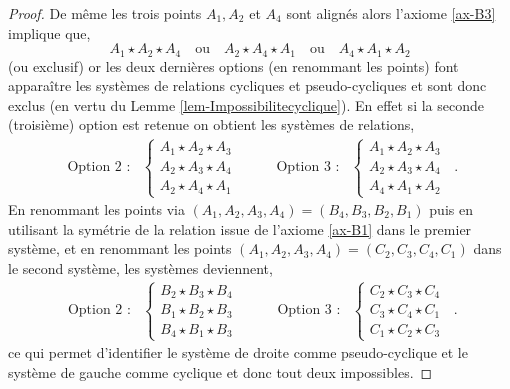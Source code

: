 \begin{cor}
\begin{proof}
        De même les trois points $A_1,A_2$ et $A_4$ sont alignés alors l'axiome \ref{ax-B3} implique que,
        \begin{equation*}
            A_1 \star A_2 \star A_4 \quad\text{ou}\quad A_2 \star A_4 \star A_1 \quad\text{ou}\quad A_4 \star A_1 \star A_2 
        \end{equation*}
        (ou exclusif) or les deux dernières options (en renommant les points) font apparaître les systèmes de relations cycliques et pseudo-cycliques et sont donc exclus (en vertu du Lemme \ref{lem-Impossibilitecyclique}). En effet si la seconde (troisième) option est retenue on obtient les systèmes de relations,
        \begin{equation*}
        \begin{array}{cccc}
        \text{Option 2 }:&\left\{
            \begin{array}{cc}
                 A_{1} \star A_{2} \star A_{3} \\
                 A_{2} \star A_{3} \star A_{4} \\
                 A_2 \star A_4 \star A_1
            \end{array}
            \right. &\qquad\text{Option 3 } :&    \left\{\begin{array}{c}
                 A_{1} \star A_{2} \star A_{3} \\
                 A_{2} \star A_{3} \star A_{4} \\
                 A_4 \star A_1 \star A_2
            \end{array}\right.
        \end{array} \,.
        \end{equation*}
        En renommant les points via $(A_1,A_2,A_3,A_4)=( B_4,B_3,B_2,B_1)$ puis en utilisant la symétrie de la relation  issue de l'axiome \ref{ax-B1} dans le premier système, et en renommant les points $(A_1,A_2,A_3,A_4)=(C_2,C_3,C_4,C_1)$ dans le second système, les systèmes deviennent,
        \begin{equation*}
        \begin{array}{cccc}
        \text{Option 2 }:&\left\{
            \begin{array}{c}
                 B_{2} \star B_{3} \star B_{4} \\
                 B_{1} \star B_{2} \star B_{3} \\
                 B_4 \star B_1 \star B_3
            \end{array}
            \right. &\qquad\text{Option 3 } :&    \left\{\begin{array}{c}
                 C_2 \star C_3 \star C_4 \\
                 C_3 \star C_4 \star C_1 \\
                 C_1 \star C_2 \star C_3
            \end{array}\right.
        \end{array} \,.
        \end{equation*}
        ce qui permet d'identifier le système de droite comme pseudo-cyclique et le système de gauche comme cyclique et donc tout deux impossibles.
        

\end{proof}
\end{cor}
